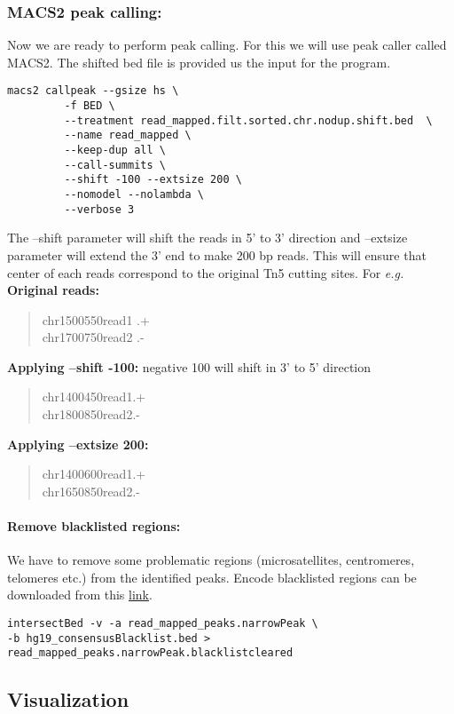 \documentclass[10pt]{article}
\newcommand\tab[1][1cm]{\hspace*{#1}}
\begin{document}
\subsubsection{MACS2 peak calling:} Now we are ready to perform peak calling. For this we will use  peak caller called MACS2. The shifted bed file is provided us the input for the program.
\begin{verbatim}
macs2 callpeak --gsize hs \
         -f BED \
         --treatment read_mapped.filt.sorted.chr.nodup.shift.bed  \
         --name read_mapped \
         --keep-dup all \
         --call-summits \
         --shift -100 --extsize 200 \
         --nomodel --nolambda \
         --verbose 3
\end{verbatim}
The --shift parameter  will shift the reads in 5' to 3' direction and --extsize parameter will extend the 3' end to make 200 bp reads. This will ensure that center of each reads correspond to the original Tn5 cutting sites. For {\em e.g.}\\
\textbf{Original reads:}
\begin{verse}
chr1\tab 500\tab 550\tab read1 \tab .\tab +\\
chr1\tab 700\tab 750\tab read2 \tab .\tab-
\end{verse}
\textbf{Applying --shift -100:} negative 100 will shift in 3' to 5' direction
\begin{verse}
chr1\tab 400\tab 450\tab read1\tab .\tab +\\
chr1\tab 800\tab 850\tab read2\tab .\tab -
\end{verse}
\textbf{Applying --extsize 200:}
\begin{verse}
chr1\tab 400\tab 600\tab read1\tab .\tab +\\
chr1\tab 650\tab 850\tab read2\tab .\tab -
\end{verse}
\paragraph{Remove blacklisted regions:} We have to remove some problematic regions (microsatellites, centromeres, telomeres etc.) from the identified peaks. Encode blacklisted regions can be downloaded from this \href{https://sites.google.com/site/anshulkundaje/projects/blacklists}{link}.
\begin{verbatim}
intersectBed -v -a read_mapped_peaks.narrowPeak \
-b hg19_consensusBlacklist.bed > read_mapped_peaks.narrowPeak.blacklistcleared
\end{verbatim}
\subsection{Visualization}
\end{document}
